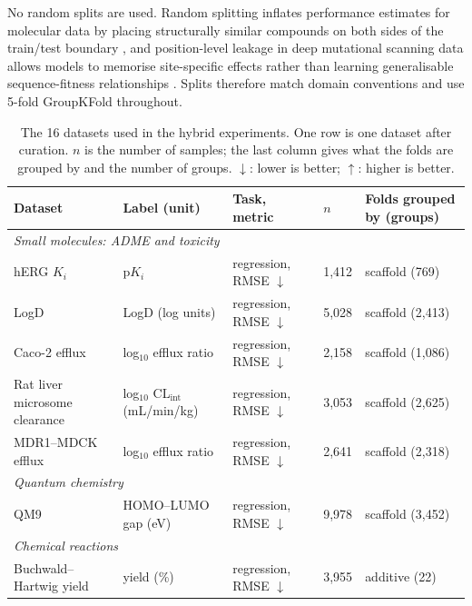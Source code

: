 No random splits are used. Random splitting inflates performance estimates for molecular data by placing structurally similar compounds on both sides of the train/test boundary \citep{Yang2019, Wallach2018}, and position-level leakage in deep mutational scanning data allows models to memorise site-specific effects rather than learning generalisable sequence-fitness relationships \citep{Notin2023, Vieira2026}. Splits therefore match domain conventions and use 5-fold GroupKFold throughout.

\begin{table}[htbp]
\centering
\small
\setlength{\tabcolsep}{3pt}
\caption{The 16 datasets used in the hybrid experiments. One row is one dataset after curation. $n$ is the number of samples; the last column gives what the folds are grouped by and the number of groups. $\downarrow$: lower is better; $\uparrow$: higher is better.}
\label{tab:datasets}
\begin{tabular}{p{3.0cm}p{3.3cm}p{2.3cm}p{1.1cm}p{3.5cm}}
\toprule
Dataset & Label (unit) & Task, metric & $n$ & Folds grouped by (groups) \\
\midrule
\multicolumn{5}{l}{\textit{Small molecules: ADME and toxicity}} \\
hERG $K_i$ \citep{Zdrazil2023} & p$K_i$ & regression, RMSE $\downarrow$ & 1,412 & scaffold (769) \\
LogD \citep{openadmet} & LogD (log units) & regression, RMSE $\downarrow$ & 5,028 & scaffold (2,413) \\
Caco-2 efflux \citep{openadmet} & log$_{10}$ efflux ratio & regression, RMSE $\downarrow$ & 2,158 & scaffold (1,086) \\
Rat liver microsome clearance \citep{fang2023, polaris} & log$_{10}$ CL$_\text{int}$ (mL/min/kg) & regression, RMSE $\downarrow$ & 3,053 & scaffold (2,625) \\
MDR1--MDCK efflux \citep{fang2023, polaris} & log$_{10}$ efflux ratio & regression, RMSE $\downarrow$ & 2,641 & scaffold (2,318) \\
\midrule
\multicolumn{5}{l}{\textit{Quantum chemistry}} \\
QM9 \citep{Ramakrishnan2014, qm9_dataset} & HOMO--LUMO gap (eV) & regression, RMSE $\downarrow$ & 9,978 & scaffold (3,452) \\
\midrule
\multicolumn{5}{l}{\textit{Chemical reactions}} \\
Buchwald--Hartwig yield \citep{Ahneman2018} & yield (\%) & regression, RMSE $\downarrow$ & 3,955 & additive (22) \\

\end{tabular}
\end{table}
